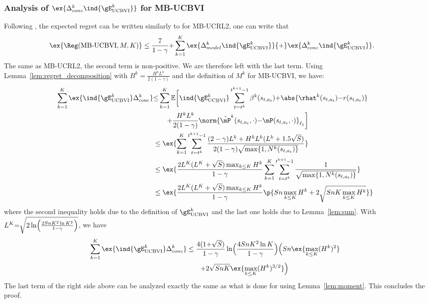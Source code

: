 \begin{subappendices}
\subsubsection{Analysis of \texorpdfstring{$\ex{\Delta_{conc}^k\ind{\gE_\text{UCBVI}^{k}}}$}{} for MB-UCBVI}
Following , the expected regret can be written similarly to  for MB-UCRL2, one can write that
\begin{align*}
    \ex{\Reg(\text{MB-UCBVI},M,K)}
    &\le \frac{7}{1-\gamma} {+} \sum_{k=1}^{K} \ex{\Delta_{model}^k\ind{\gE_\text{UCBVI}^{k}}} {+} \ex{\Delta_{conc}^k\ind{\gE_\text{UCBVI}^{k}}}.
\end{align*}
The same as MB-UCRL2, the second term is non-positive.
We are therefore left with the last term.
Using Lemma~\ref{lem:regret_decomposition} with $B^k=\frac{H^kL^{k}}{2(1-\gamma)}$ and the definition of $M^k$ for MB-UCBVI, we have:
\begin{align*}
    \sum_{k=1}^K \ex{ \ind{\gE^{k}_\text{UCBVI}} \Delta^k_\text{conc}}
    &{\le} \sum_{k=1}^K \mathbb{E}\bigg[ \ind{\gE^{k}_\text{UCBVI}}\sum_{t=t^k}^{t^{k+1}-1} \beta^{k}(s_{t,a_t}){+}\abs{\rhat^{k}(s_{t,a_t}){-}r(s_{t,a_t})} \\
    &\qquad {+}\frac{H^kL^{k}}{2(1-\gamma)}\norm{\hat{\mP}^{k}(s_{t,a_t},\cdot){-}\mP(s_{t,a_t},\cdot)}_{\ell_1} \bigg] \\
    &\le \ex{\sum_{k=1}^{K}\sum_{t=t^k}^{t^{k+1}-1} \frac{(2-\gamma)L^{k}+H^kL^{k}(L^{k}+1.5\sqrt{S})}{2(1-\gamma)\sqrt{\max\{1,N^{k}(s_{t,a_t})\} }}} \\
    &\le \ex{\frac{2L^K(L^K+\sqrt{S})\max_{k\le K}H^k}{1-\gamma} \sum_{k=1}^{K} \sum_{t=t^k}^{t^{k+1}-1} \frac1{\sqrt{\max\{1,N^{k}(s_{t,a_t})\} }}} \\
    &\le \ex{\frac{2L^K(L^K+\sqrt{S})\max_{k\le K}H^k}{1-\gamma} \p{Sn\max_{k\le K}H^k +2\sqrt{SnK\max_{k\le K}H^k} }} 
\end{align*}
where the second inequality holds due to the definition of $\gE^{k}_\text{UCBVI}$ and the last one holds due to Lemma~\ref{lem:sum}.
With $L^K{=}\sqrt{2\ln\Bigl(\frac{2SnK^2\ln K^2}{1-\gamma}\Bigr)}$, we have
\begin{align*}
    \sum_{k=1}^K \ex{ \ind{\gE^{k}_\text{UCBVI}} \Delta^k_{conc}}
    &\le \frac{4(1{+}\sqrt{S})}{1-\gamma} \ln \Bigl(\frac{4SnK^2\ln K}{1-\gamma}\Bigr) \Bigl(Sn\ex{\max_{k\le K}(H^k)^2} \\
    &\qquad {+}2\sqrt{SnK} \ex{\max_{k\le K}(H^k)^{3/2}}\Bigr)
\end{align*}
The last term of the right side above can be analyzed exactly the same as what is done for  using Lemma~\ref{lem:moment}.
This concludes the proof.


\end{subappendices}

